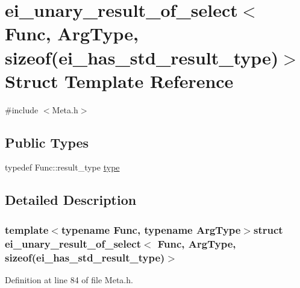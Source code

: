 \hypertarget{structei__unary__result__of__select_3_01_func_00_01_arg_type_00_01sizeof_07ei__has__std__result__type_08_4}{\section{ei\-\_\-unary\-\_\-result\-\_\-of\-\_\-select$<$ Func, Arg\-Type, sizeof(ei\-\_\-has\-\_\-std\-\_\-result\-\_\-type)$>$ Struct Template Reference}
\label{structei__unary__result__of__select_3_01_func_00_01_arg_type_00_01sizeof_07ei__has__std__result__type_08_4}
}


{\ttfamily \#include $<$Meta.\-h$>$}

\subsection*{Public Types}
\begin{DoxyCompactItemize}
\item 
typedef Func\-::result\-\_\-type \hyperlink{structei__unary__result__of__select_3_01_func_00_01_arg_type_00_01sizeof_07ei__has__std__result__type_08_4_ab1f27bc4e37dbb80a29d810fd50752f6}{type}
\end{DoxyCompactItemize}


\subsection{Detailed Description}
\subsubsection*{template$<$typename Func, typename Arg\-Type$>$struct ei\-\_\-unary\-\_\-result\-\_\-of\-\_\-select$<$ Func, Arg\-Type, sizeof(ei\-\_\-has\-\_\-std\-\_\-result\-\_\-type)$>$}



Definition at line 84 of file Meta.\-h.



